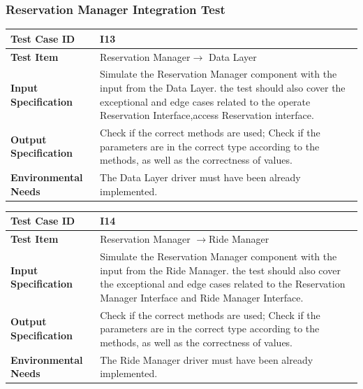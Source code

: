 \documentclass[a4paper,11pt]{article}
\begin{document}
		\subsubsection{Reservation Manager Integration Test}
		\begin{table}[H] 
\begin{center}
\renewcommand\arraystretch{1.5}
\begin{tabular}{|p{5cm}|p{7cm}|}
 \hline
\textbf{Test Case ID}& I13\\
 \hline
\textbf{Test Item}&Reservation Manager$\rightarrow$ Data Layer\\
 \hline
\textbf{Input Specification}&Simulate the Reservation Manager component with the input from the Data Layer. the test should also
cover the exceptional and edge cases related to the operate Reservation Interface,access Reservation interface.\\
 \hline
\textbf{Output Specification}&Check if the correct methods are used;
Check if the parameters are in the correct type according to the methods, as well as the correctness of values.\\
 \hline
 \textbf{Environmental Needs}&The Data Layer driver must have been already implemented.\\
 \hline
\end{tabular}
\end{center}
\end{table}		
\begin{table}[H] 
\begin{center}
\renewcommand\arraystretch{1.5}
\begin{tabular}{|p{5cm}|p{7cm}|}
 \hline
\textbf{Test Case ID}& I14\\
 \hline
\textbf{Test Item}&Reservation Manager $\rightarrow$Ride Manager\\
 \hline
\textbf{Input Specification}&Simulate the Reservation Manager component with the input from the Ride Manager. the test should also cover the exceptional and edge cases related to the Reservation Manager Interface and Ride Manager Interface.\\
 \hline
\textbf{Output Specification}&Check if the correct methods are used;
Check if the parameters are in the correct type according to the methods, as well as the correctness of values.\\
 \hline
 \textbf{Environmental Needs}&The Ride Manager driver must have been already implemented.\\
 \hline
\end{tabular}
\end{center}
\end{table}		
\end{document}
